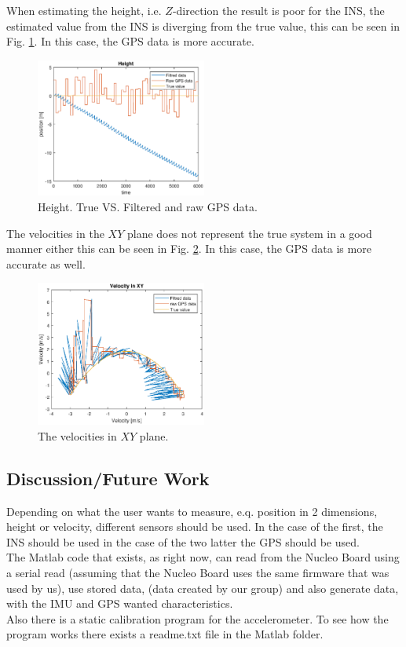 When estimating the height, i.e. $Z$-direction the result is poor for the INS, the estimated value from the INS is diverging from the true value, this can be seen in Fig. \ref{Fig:Height}. In this case, the GPS data is more accurate. 
\begin{figure}[H]
\centering
\includegraphics[width=0.5\textwidth]{Figures/Height.eps}
\caption{Height. True VS. Filtered and raw GPS data.}
\label{Fig:Height}
\end{figure}
The velocities in the $XY$ plane does not represent the true system in a good manner either this can be seen in Fig. \ref{Fig:velocity}. In this case, the GPS data is more accurate as well.

\begin{figure}[H]
\centering
\includegraphics[width=0.5\textwidth]{Figures/velocity.eps}
\caption{The velocities in $XY$ plane.}
\label{Fig:velocity}
\end{figure}
\subsection{Discussion/Future Work}
Depending on what the user wants to measure, e.q. position in 2 dimensions, height or velocity, different sensors should be used. In the case of the first, the INS should be used in the case of the two latter the GPS should be used. \\

The Matlab code that exists, as right now, can read from the Nucleo Board using a serial read (assuming that the Nucleo Board uses the same firmware that was used by us), use stored data, (data created by our group) and also generate data, with the IMU and GPS wanted characteristics. \\
Also there is a static calibration program for the accelerometer. To see how the program works there exists a readme.txt file in the Matlab folder.\\

